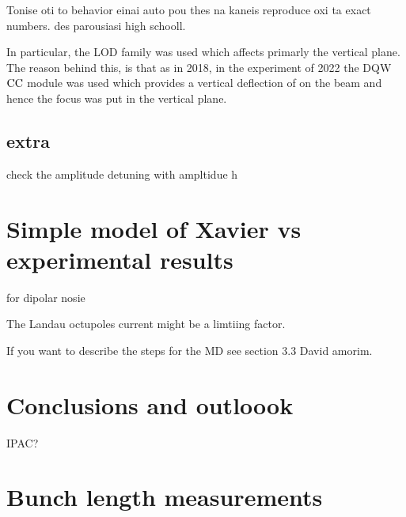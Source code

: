 Tonise oti to behavior einai auto pou thes na kaneis reproduce oxi ta exact numbers. des parousiasi high schooll.


In particular, the LOD family was used which affects primarly the vertical plane. The reason behind this, is that as in 2018, in the experiment of 2022 the DQW ${\mathrm{CC}}$ module was used which provides a vertical deflection of on the beam and hence the focus was put in the vertical plane.


\subsection{extra}
check the amplitude detuning with ampltidue
h%


\section{Simple model of Xavier vs experimental results}
for dipolar nosie


The Landau octupoles current might be a limtiing factor.


If you want to describe the steps for the MD see section 3.3 David amorim.


\section{Conclusions and outloook}

IPAC?


\section{Bunch length measurements}
